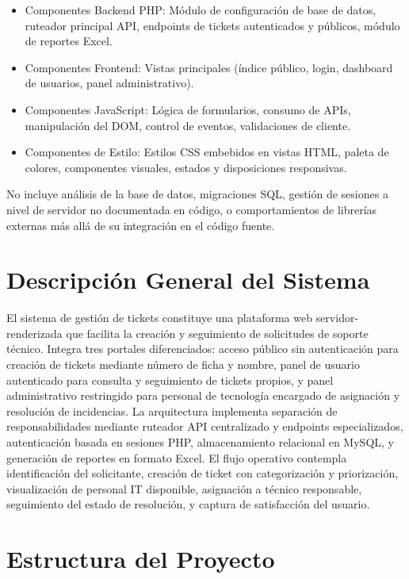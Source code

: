 \documentclass[12pt,a4paper]{article}
\begin{document}
\begin{itemize}
    \item Componentes Backend PHP: Módulo de configuración de base de datos, ruteador principal API, endpoints de tickets autenticados y públicos, módulo de reportes Excel.
    \item Componentes Frontend: Vistas principales (índice público, login, dashboard de usuarios, panel administrativo).
    \item Componentes JavaScript: Lógica de formularios, consumo de APIs, manipulación del DOM, control de eventos, validaciones de cliente.
    \item Componentes de Estilo: Estilos CSS embebidos en vistas HTML, paleta de colores, componentes visuales, estados y disposiciones responsivas.
\end{itemize}

No incluye análisis de la base de datos, migraciones SQL, gestión de sesiones a nivel de servidor no documentada en código, o comportamientos de librerías externas más allá de su integración en el código fuente.

\newpage

\section{Descripción General del Sistema}

El sistema de gestión de tickets constituye una plataforma web servidor-renderizada que facilita la creación y seguimiento de solicitudes de soporte técnico. Integra tres portales diferenciados: acceso público sin autenticación para creación de tickets mediante número de ficha y nombre, panel de usuario autenticado para consulta y seguimiento de tickets propios, y panel administrativo restringido para personal de tecnología encargado de asignación y resolución de incidencias. La arquitectura implementa separación de responsabilidades mediante ruteador API centralizado y endpoints especializados, autenticación basada en sesiones PHP, almacenamiento relacional en MySQL, y generación de reportes en formato Excel. El flujo operativo contempla identificación del solicitante, creación de ticket con categorización y priorización, visualización de personal IT disponible, asignación a técnico responsable, seguimiento del estado de resolución, y captura de satisfacción del usuario.

\newpage

\section{Estructura del Proyecto}
\end{document}
